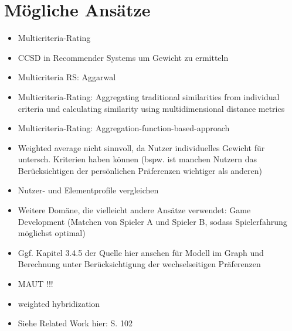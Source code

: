 \section{Mögliche Ansätze}
\begin{itemize}
    \item Multicriteria-Rating %
    \item CCSD in Recommender Systems um Gewicht zu ermitteln %
    \item Multicriteria RS: Aggarwal %
    \item Multicriteria-Rating: Aggregating traditional similarities from individual criteria und calculating similarity using multidimensional distance metrics %
    \item Multicriteria-Rating: Aggregation-function-based-approach %
    \item Weighted average nicht sinnvoll, da Nutzer individuelles Gewicht für untersch. Kriterien haben können (bspw. ist manchen Nutzern das Berücksichtigen der persönlichen Präferenzen wichtiger als anderen) %
    \item Nutzer- und Elementprofile vergleichen %
    \item Weitere Domäne, die vielleicht andere Ansätze verwendet: Game Development (Matchen von Spieler A und Spieler B, sodass Spielerfahrung möglichst optimal) %
    \item Ggf. Kapitel 3.4.5 der Quelle hier ansehen für Modell im Graph und Berechnung unter Berücksichtigung der wechselseitigen Präferenzen %
    \item MAUT !!! %
    \item weighted hybridization %
    \item Siehe Related Work hier: S. 102 %
\end{itemize}

